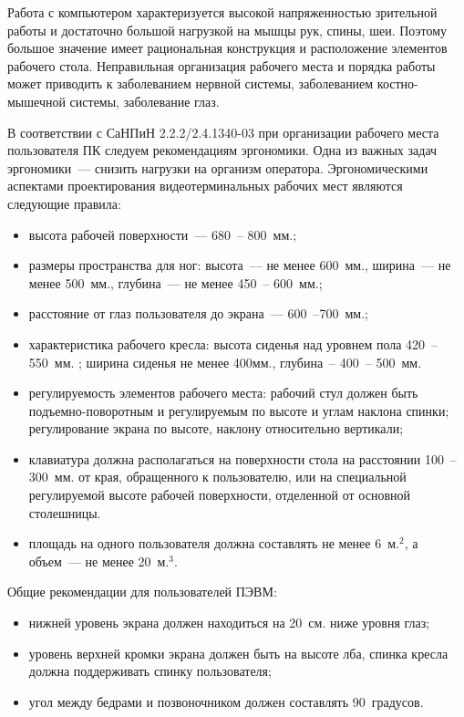 Работа с компьютером характеризуется высокой напряженностью зрительной работы и достаточно большой нагрузкой на мышцы рук, спины, шеи. Поэтому большое значение имеет рациональная конструкция и расположение элементов рабочего стола. Неправильная организация рабочего места и порядка работы может приводить к заболеванием нервной системы, заболеванием костно-мышечной системы, заболевание глаз.

В соответствии с СаНПиН 2.2.2/2.4.1340-03 при организации рабочего места пользователя ПК следуем рекомендациям эргономики. Одна из важных задач эргономики~--- снизить нагрузки на организм оператора. Эргономическими аспектами проектирования видеотерминальных рабочих мест являются следующие правила:
\begin{itemize}
\item высота рабочей поверхности~--- 680~-- 800~мм.;
\item размеры пространства для ног: высота~--- не менее 600~мм., ширина~--- не менее 500~мм., глубина~--- не менее 450~-- 600~мм.;
\item расстояние от глаз пользователя до экрана~--- 600~--700~мм.;
\item характеристика рабочего кресла: высота сиденья над уровнем пола 420~-- 550~мм. ; ширина сиденья не менее 400мм., глубина~-- 400~-- 500~мм.
\item регулируемость элементов рабочего места: рабочий стул должен быть подъемно-поворотным и регулируемым по высоте и углам наклона спинки; регулирование экрана по высоте, наклону относительно вертикали;
\item клавиатура должна располагаться на поверхности стола на расстоянии 100~-- 300~мм. от края, обращенного к пользователю, или на специальной регулируемой высоте рабочей поверхности, отделенной от основной столешницы.
\item площадь на одного пользователя должна составлять не менее 6~м.$^2$, а объем~--- не менее 20~м.$^3$.
\end{itemize}

Общие рекомендации для пользователей ПЭВМ:
\begin{itemize}
\item нижней уровень экрана должен находиться на 20~см. ниже уровня глаз;
\item уровень верхней кромки экрана должен быть на высоте лба, 
спинка кресла должна поддерживать спинку пользователя;
\item угол между бедрами и позвоночником должен составлять 90~градусов.
\end{itemize}

